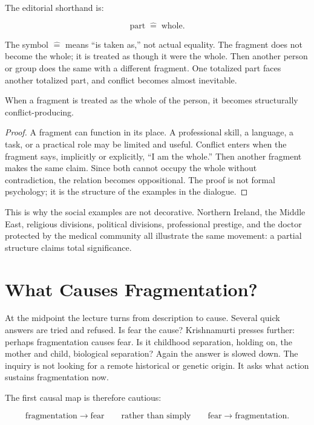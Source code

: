 The editorial shorthand is:

\begin{equation}
\text{part} \;\widehat{=}\; \text{whole}.
\end{equation}

The symbol \(\widehat{=}\) means ``is taken as,'' not actual equality. The fragment does not become the whole; it is treated as though it were the whole. Then another person or group does the same with a different fragment. One totalized part faces another totalized part, and conflict becomes almost inevitable.

\begin{proposition}
When a fragment is treated as the whole of the person, it becomes structurally conflict-producing.
\end{proposition}

\begin{proof}
A fragment can function in its place. A professional skill, a language, a task, or a practical role may be limited and useful. Conflict enters when the fragment says, implicitly or explicitly, ``I am the whole.'' Then another fragment makes the same claim. Since both cannot occupy the whole without contradiction, the relation becomes oppositional. The proof is not formal psychology; it is the structure of the examples in the dialogue.
\end{proof}

This is why the social examples are not decorative. Northern Ireland, the Middle East, religious divisions, political divisions, professional prestige, and the doctor protected by the medical community all illustrate the same movement: a partial structure claims total significance.

\section{What Causes Fragmentation?}

At the midpoint the lecture turns from description to cause. Several quick answers are tried and refused. Is fear the cause? Krishnamurti presses further: perhaps fragmentation causes fear. Is it childhood separation, holding on, the mother and child, biological separation? Again the answer is slowed down. The inquiry is not looking for a remote historical or genetic origin. It asks what action sustains fragmentation now.

The first causal map is therefore cautious:

\begin{equation}
\text{fragmentation}
\longrightarrow
\text{fear}
\qquad
\text{rather than simply}
\qquad
\text{fear}
\longrightarrow
\text{fragmentation}.
\end{equation}

